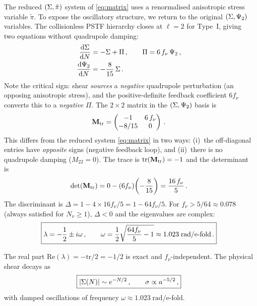 The reduced $(\Sigma, \tilde\pi)$ system of \eqref{eq:matrix} uses a renormalised anisotropic stress variable $\tilde\pi$.  To expose the oscillatory structure, we return to the original $(\Sigma, \Psi_2)$ variables.  The collisionless PSTF hierarchy closes at $\ell = 2$ for Type~I, giving two equations without quadrupole damping:
\begin{align}
\frac{\mathrm{d}\Sigma}{\mathrm{d} N} &= -\Sigma + \Pi\,,\qquad \Pi = 6\,f_\nu\,\Psi_2\,,\label{eq:dSig_tr}\\
\frac{\mathrm{d}\Psi_2}{\mathrm{d} N} &= -\frac{8}{15}\,\Sigma\,.\label{eq:dPsi2_tr}
\end{align}
Note the critical sign: shear \emph{sources} a \emph{negative} quadrupole perturbation (an opposing anisotropic stress), and the positive-definite feedback coefficient $6f_\nu$ converts this to a \emph{negative} $\Pi$.  The $2\times 2$ matrix in the $(\Sigma, \Psi_2)$ basis is
\begin{equation}
\mathbf{M}_{\rm tr} = \begin{pmatrix} -1 & 6\,f_\nu \\ -8/15 & 0 \end{pmatrix}\,.\label{eq:Mtr}
\end{equation}
This differs from the reduced system \eqref{eq:matrix} in two ways: (i)~the off-diagonal entries have \emph{opposite} signs (negative feedback loop), and (ii)~there is no quadrupole damping ($M_{22} = 0$).  The trace is $\mathrm{tr}(\mathbf{M}_{\rm tr}) = -1$ and the determinant is
\begin{equation}
\det(\mathbf{M}_{\rm tr}) = 0 - (6f_\nu)\!\left(-\frac{8}{15}\right) = \frac{16\,f_\nu}{5}\,.
\end{equation}
The discriminant is $\Delta = 1 - 4 \times 16f_\nu/5 = 1 - 64f_\nu/5$.  For $f_\nu > 5/64 \approx 0.078$ (always satisfied for $N_\nu \geq 1$), $\Delta < 0$ and the eigenvalues are complex:
\begin{equation}
\boxed{\lambda = -\frac{1}{2} \pm i\omega\,,\qquad \omega = \frac{1}{2}\sqrt{\frac{64 f_\nu}{5} - 1} \approx 1.023\;\text{rad/e-fold}\,.}
\end{equation}

\begin{corollary}
The real part $\mathrm{Re}(\lambda) = -\mathrm{tr}/2 = -1/2$ is exact and $f_\nu$-independent.  The physical shear decays as
\begin{equation}
\boxed{|\Sigma(N)| \sim e^{-N/2}\,,\qquad \sigma \propto a^{-5/2}\,,}
\end{equation}
with damped oscillations of frequency $\omega \approx 1.023\;\mathrm{rad/e\text{-}fold}$.
\end{corollary}

